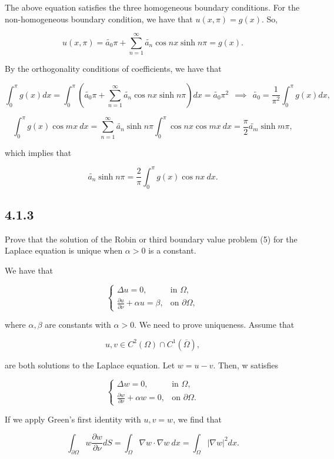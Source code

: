 \documentclass{article}
\begin{document}
The above equation satisfies the three homogeneous boundary conditions. For the non-homogeneous boundary condition, we have that $u(x,\pi)=g(x)$. So,

$$u(x,\pi)=\widetilde{a_0} \pi + \sum_{n=1}^{\infty}\widetilde{a_n} \cos nx \sinh n\pi=g(x).$$

By the orthogonality conditions of coefficients, we have that

$$\int_0^{\pi}g(x)dx= \int_0^{\pi}(\widetilde{a_0} \pi + \sum_{n=1}^{\infty}\widetilde{a_n} \cos nx \sinh n\pi)dx = \widetilde{a_0} \pi^2 ~~\implies~~\widetilde{a_0}=\frac{1}{\pi^2}\int_0^{\pi}g(x)dx,$$

$$\int_0^{\pi}g(x)\cos mx ~dx= \sum_{n=1}^{\infty}\widetilde{a_n}\sinh  n\pi \int_0^{\pi}\cos nx \cos mx~dx=\frac{\pi}{2}\widetilde{a_m}\sinh m\pi,$$

which implies that

$$\widetilde{a_n}\sinh n\pi=\frac{2}{\pi}\int_0^{\pi}g(x)\cos nx ~dx.$$


\subsection{\textbf{4.1.3}} Prove that the solution of the Robin or third boundary value problem (5) for the Laplace equation is unique when $\alpha>0$ is a constant.

We have that

\[
  \begin{cases}
  \Delta u = 0, & \text{in $\Omega$}, \\
  \frac{\partial u}{\partial \nu} + \alpha u =\beta, & \text{on $\partial \Omega$},
  \end{cases}
\]

where $\alpha, \beta$ are constants with $\alpha > 0$. We need to prove uniqueness. Assume that

$$u,v \in C^2(\Omega)\cap C^1(\overline{\Omega}),$$

are both solutions to the Laplace equation. Let $w=u-v$. Then, w satisfies

\[
  \begin{cases}
  \Delta w = 0, & \text{in $\Omega$}, \\
  \frac{\partial w}{\partial \nu} + \alpha w =0, & \text{on $\partial \Omega$}.
  \end{cases}
\]

If we apply Green's first identity with $u,v=w$, we find that 

$$\int_{\partial\Omega} w \frac{\partial w}{\partial \nu}dS=\int_{\Omega}\nabla w \cdot \nabla w~dx=\int_{\Omega}|\nabla w|^2 dx.$$
\end{document}
